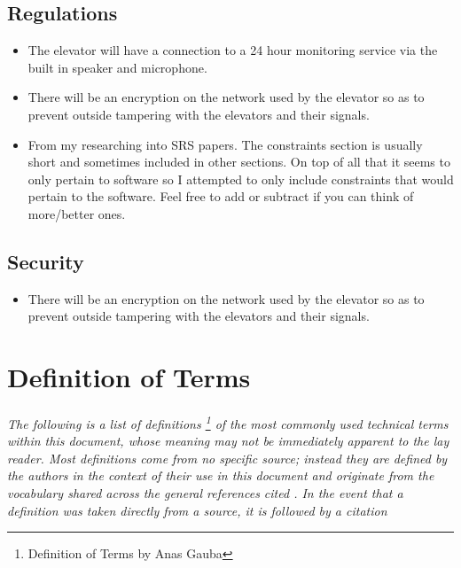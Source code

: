 \documentclass[12pt]{article}
\begin{document}
	\subsection{Regulations}
	\begin{itemize}
		\item The elevator will have a connection to a 24 hour monitoring service via the built in speaker and microphone.
		\item There will be an encryption on the network used by the elevator so as to prevent outside tampering with the elevators and their signals.
		\item From my researching into SRS papers. The constraints section is usually short and sometimes included in other sections. On top of all that it seems to only pertain to software so I attempted to only include constraints that would pertain to the software. Feel free to add or subtract if you can think of more/better ones.
	\end{itemize}

	\subsection{Security}
	\begin{itemize}
		\item There will be an encryption on the network used by the elevator so as to prevent outside tampering with the elevators and their signals.
	\end{itemize}


\section{Definition of Terms} \label{defs} %
	\paragraph{} \textit{The following is a list of definitions \footnote{Definition of Terms by Anas Gauba} of the most commonly 
	used technical terms within this document, whose meaning may not be immediately 
	apparent to the lay reader. Most definitions come from no specific source; instead 
	they are defined by the authors in the context of their use in this document and 
	originate from the vocabulary shared across the general references cited \nocite{*}. In 
	the event that a definition was taken directly from a source, it is followed by a 
	citation}
	
\end{document}
